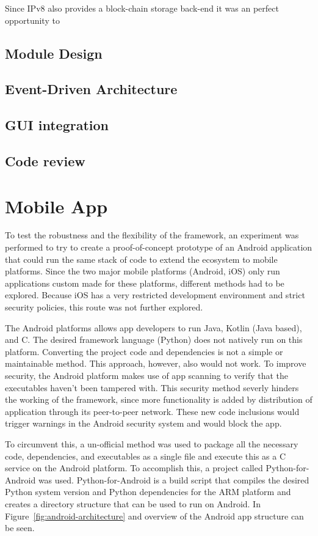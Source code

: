 Since IPv8 also provides a block-chain storage back-end it was an perfect opportunity to 

\section{Module Design}

\section{Event-Driven Architecture}

\section{GUI integration}

\section{Code review}

\chapter{Mobile App}

To test the robustness and the flexibility of the framework, an experiment was performed to try to create a proof-of-concept prototype of an Android application that could run the same stack of code to extend the ecosystem to mobile platforms. Since the two major mobile platforms (Android, iOS) only run applications custom made for these platforms, different methods had to be explored. Because iOS has a very restricted development environment and strict security policies, this route was not further explored.

The Android platforms allows app developers to run Java, Kotlin (Java based), and C. The desired framework language (Python) does not natively run on this platform. Converting the project code and dependencies is not a simple or maintainable method. This approach, however, also would not work. To improve security, the Android platform makes use of app scanning to verify that the executables haven't been tampered with. This security method severly hinders the working of the framework, since more functionality is added by distribution of application through its peer-to-peer network. These new code inclusions would trigger warnings in the Android security system and would block the app.

To circumvent this, a un-official method was used to package all the necessary code, dependencies, and executables as a single file and execute this as a C service on the Android platform. To accomplish this, a project called Python-for-Android was used. Python-for-Android is a build script that compiles the desired Python system version and Python dependencies for the ARM platform and creates a directory structure that can be used to run on Android. In Figure~\ref{fig:android-architecture} and overview of the Android app structure can be seen.

